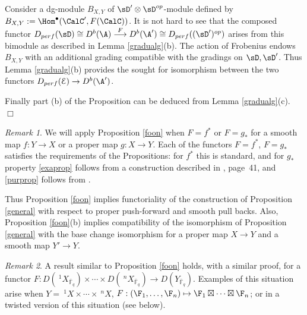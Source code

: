 \documentclass[11pt]{amsart}
\theoremstyle{definition}
\theoremstyle{remark}
\theoremstyle{remark}
\newtheorem{Rem}{Remark}
\newcommand{\bu}{\bullet}
\newcommand{\To}{\longrightarrow}
\newcommand{\<}{\langle}
\renewcommand{\>}{\rangle}
\newcommand{\Fqbar}{{\bar{\mathbb F}_q}}
\newcommand{\Epur}{{\mathcal E}}
\begin{document}
Consider a dg-module $B_{X,Y}$ of $\sD'\otimes \sD^{op}$-module defined by $B_{X,Y}:=
\Hom^\bu(\CalC',F(\CalC))$. It is not hard to see that the composed functor
$D_{perf}(\sD)\cong D^b(\A)\overset{F}{\To} D^b(\A')\cong D_{perf}((\sD')^{op})$ arises from this
bimodule as described in Lemma \ref{gradualg}(b). The action of Frobenius endows $B_{X,Y}$
with an additional grading compatible with the gradings on $\sD,\sD'$. 
Thus  Lemma \ref{gradualg}(b)
provides the sought for isomorphism between the two functors $D_{perf}(\Epur)\to D^b(\A')$.

Finally part (b) of the Proposition 
%
can be deduced from Lemma \ref{gradualg}(c). \hfill $\Box$


\begin{Rem}\label{pull_push_fun}
We will apply Proposition \ref{foon} when
$F=f^*$ or $F=g_*$ for a 
smooth map $f:Y\to X$ or a proper map $g:X\to Y$. Each of  the functors
$F=f^*$, $F=g_*$ 
satisfies the requirements of the Propositions:
 for $f^*$ this is standard, and for $g_*$ 
property \ref{exaprop}  
follows from a construction described in \cite{Bedr}, page~41, 
and \ref{purprop} follows from \cite{BBD}.

Thus Proposition \ref{foon} implies functoriality 
of the construction of Proposition
\ref{general} with respect to proper push-forward and 
smooth pull backs. Also, Proposition
\ref{foon}(b) implies 
compatibility of the isomorphism of Proposition \ref{general} with
the base change isomorphism for 
 a proper map $X\to Y$ and a smooth map $Y'\to Y$. 
\end{Rem}

\begin{Rem}\label{multifoon}
A result similar to Proposition \ref{foon} holds, with a similar proof, for
 a functor
 $F:D(\ ^1X_{\Fqbar})\times \cdots \times D(\ ^nX_{\Fqbar}) \to 
D(Y_{\Fqbar})$. Examples of this situation arise when
$Y=\ ^1X\times \cdots \times\ ^nX$, 
$F:(\F_1, \dots, \F_n) \mapsto \F_1\boxtimes \cdots \boxtimes
\F_n$; or in a twisted version of this situation (see below). 
\end{Rem}
\end{document}
